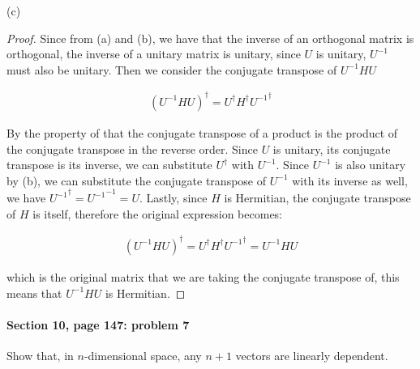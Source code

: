 \documentclass{article}
\begin{document}
(c) \begin{proof} Since from (a) and (b), we have that the inverse of an orthogonal matrix is orthogonal, the inverse of a unitary matrix is unitary, since $U$ is unitary, $U^{-1}$ must also be unitary. Then we consider the conjugate transpose of $U^{-1}HU$

\begin{align*}
(U^{-1}HU)^{\dagger} = U^{\dagger} H^{\dagger} {U^{-1}}^{\dagger}
\end{align*}

By the property of that the conjugate transpose of a product is the product of the conjugate transpose in the reverse order. Since $U$ is unitary, its conjugate transpose is its inverse, we can substitute $U^{\dagger}$ with $U^{-1}$. Since $U^{-1}$ is also unitary by (b), we can substitute the conjugate transpose of $U^{-1}$ with its inverse as well, we have ${U^{-1}}^{\dagger} = {U^{-1}}^{-1} = U$. Lastly, since $H$ is Hermitian, the conjugate transpose of $H$ is itself, therefore the original expression becomes:

\begin{align*}
(U^{-1}HU)^{\dagger} = U^{\dagger} H^{\dagger} {U^{-1}}^{\dagger} =U^{-1}HU
\end{align*}

which is the original matrix that we are taking the conjugate transpose of, this means that $U^{-1}HU$ is Hermitian.

\end{proof}
\paragraph{Section 10, page 147: problem 7}
Show that, in $n$-dimensional space, any $n + 1$ vectors are linearly dependent.
\end{document}
